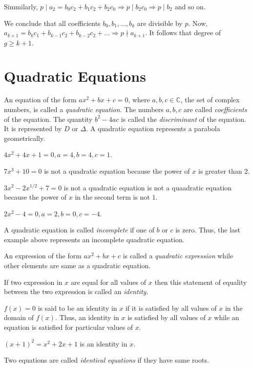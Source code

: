   Simmilarly, $p\mid a_2 = b_0c_2 + b_1c_2 + b_2c_0\Rightarrow p\mid b_2c_0\Rightarrow p\mid b_2$ and so on.

  We conclude that all coefficients $b_0, b_1, \ldots, b_k$ are divisible by $p$. Now, $a_{k + 1} = b_kc_1 +
  b_{k - 1}c_2 + b_{k - 2}c_2 + \ldots \Rightarrow p\nmid a_{k + 1}$. It follows that degree of $g\geq k  + 1$.
\stopproof
\section{Quadratic Equations}
An equation of the form $ax^2 + bx + c = 0$, where $a, b, c\in \mathbb{C}$, the set of complex numbers, is
called a {\it quadratic equation}. The numbers $a, b, c$ are called {\it coefficients} of the equation. The
quantity $b^2 - 4ac$ is called the {\it discriminant} of the equation. It is represented by $D$ or
$\Delta$. A quadratic equation represents a parabola geometrically.

\startitemize[n]
\item $4x^2 + 4x + 1 = 0, a = 4, b = 4, c = 1$.
\item $7x^3 + 10 = 0$ is not a quadratic equation because the power of $x$ is greater than $2$.
\item $3x^2 -2x^{1/2} + 7 = 0$ is not a quadratic equation is not a quaadratic equation because the power of $x$ in
  the second term is not $1$.
\item $2x^2 - 4 = 0, a = 2, b = 0, c= -4$.
\stopitemize

A quadratic equation is called {\it incomplete} if one of $b$ or $c$ is zero. Thus, the last example above
represents an incomplete quadratic equation.

An expression of the form $ax^2 + bx + c$ is called a {\it quadratic expression} while other elements are same as a quadratic
equation.

If two expression in $x$ are equal for all values of $x$ then this statement of equality between the two expression is called an
{\it identity}.

$f(x) = 0$ is said to be an identity in $x$ if it is satisfied by all values of $x$ in the domain of $f(x)$. Thus, an identity in
$x$ is satisfied by all values of $x$ while an equation is satisfied for particular values of $x$.

 $(x + 1)^2 = x^2 + 2x + 1$ is an identity in $x$.

Two equations are called {\it identical equations} if they have same roots.

